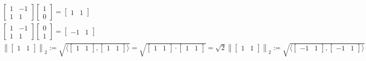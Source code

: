 \begin{equation*}
  \begin{array}{l}
    \begin{bmatrix}
      1 & -1 \\
      1 & 1
    \end{bmatrix}
    \begin{bmatrix}
      1 \\
      0
    \end{bmatrix}
    =
    \begin{bmatrix}
      1 & 1
    \end{bmatrix}
    \\
    \begin{bmatrix}
      1 & -1 \\
      1 & 1
    \end{bmatrix}
    \begin{bmatrix}
      0 \\
      1
    \end{bmatrix}
    =
    \begin{bmatrix}
      -1 & 1
    \end{bmatrix}
    \\
    \left\| \begin{bmatrix}1 & 1\end{bmatrix} \right\|_2 := \sqrt{\langle \begin{bmatrix}1 & 1\end{bmatrix}, \begin{bmatrix}1 & 1\end{bmatrix} \rangle} = \sqrt{\begin{bmatrix}1 & 1\end{bmatrix}\cdot \begin{bmatrix}1 & 1\end{bmatrix}} = \sqrt{2}
    \left\| \begin{bmatrix}1 & 1\end{bmatrix} \right\|_2 := \sqrt{\langle \begin{bmatrix}-1 & 1\end{bmatrix}, \begin{bmatrix}-1 & 1\end{bmatrix} \rangle} = \sqrt{\begin{bmatrix}-1 & 1\end{bmatrix}\cdot \begin{bmatrix}-1 & 1\end{bmatrix}} = \sqrt{2}
  \end{array}
\end{equation*}

